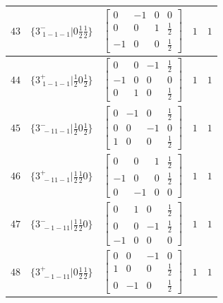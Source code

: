 \documentclass[fleqn,8pt]{jsarticle}
\begin{document}
\begin{longtable}{ccccc}
$ 43 $ & $ \{3^{-}_{\,\,1-1-1}|0 \frac{1}{2} \frac{1}{2}\} $ & $ \begin{bmatrix} 0 & -1 & 0 & 0 \\ 0 & 0 & 1 & \frac{1}{2} \\ -1 & 0 & 0 & \frac{1}{2} \end{bmatrix} $ & $ 1 $ & $ 1 $ \\ \hline
$ 44 $ & $ \{3^{+}_{\,\,1-1-1}|\frac{1}{2} 0 \frac{1}{2}\} $ & $ \begin{bmatrix} 0 & 0 & -1 & \frac{1}{2} \\ -1 & 0 & 0 & 0 \\ 0 & 1 & 0 & \frac{1}{2} \end{bmatrix} $ & $ 1 $ & $ 1 $ \\ \hline
$ 45 $ & $ \{3^{-}_{\,\,-11-1}|\frac{1}{2} 0 \frac{1}{2}\} $ & $ \begin{bmatrix} 0 & -1 & 0 & \frac{1}{2} \\ 0 & 0 & -1 & 0 \\ 1 & 0 & 0 & \frac{1}{2} \end{bmatrix} $ & $ 1 $ & $ 1 $ \\ \hline
$ 46 $ & $ \{3^{+}_{\,\,-11-1}|\frac{1}{2} \frac{1}{2} 0\} $ & $ \begin{bmatrix} 0 & 0 & 1 & \frac{1}{2} \\ -1 & 0 & 0 & \frac{1}{2} \\ 0 & -1 & 0 & 0 \end{bmatrix} $ & $ 1 $ & $ 1 $ \\ \hline
$ 47 $ & $ \{3^{-}_{\,\,-1-11}|\frac{1}{2} \frac{1}{2} 0\} $ & $ \begin{bmatrix} 0 & 1 & 0 & \frac{1}{2} \\ 0 & 0 & -1 & \frac{1}{2} \\ -1 & 0 & 0 & 0 \end{bmatrix} $ & $ 1 $ & $ 1 $ \\ \hline
$ 48 $ & $ \{3^{+}_{\,\,-1-11}|0 \frac{1}{2} \frac{1}{2}\} $ & $ \begin{bmatrix} 0 & 0 & -1 & 0 \\ 1 & 0 & 0 & \frac{1}{2} \\ 0 & -1 & 0 & \frac{1}{2} \end{bmatrix} $ & $ 1 $ & $ 1 $ \\
\end{longtable}
\end{document}
